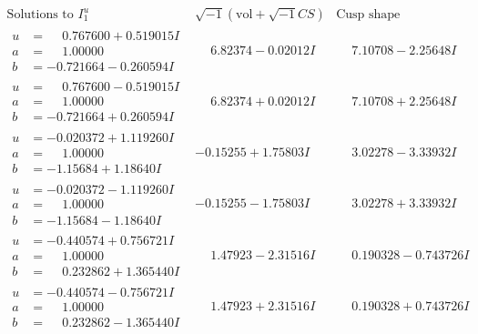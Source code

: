 \documentclass[1p]{elsarticle_modified}
\theoremstyle{definition}
\newcommand{\I}{\sqrt{-1}}
\begin{document}
$$\begin{array}{c|c|c}  
\text{Solutions to }I^u_{1}& \I (\text{vol} + \sqrt{-1}CS) & \text{Cusp shape}\\
 \hline 
\begin{aligned}
u &= \phantom{-}0.767600 + 0.519015 I \\
a &= \phantom{-}1.00000\phantom{ +0.000000I} \\
b &= -0.721664 - 0.260594 I\end{aligned}
 & \phantom{-}6.82374 - 0.02012 I & \phantom{-}7.10708 - 2.25648 I \\ \hline\begin{aligned}
u &= \phantom{-}0.767600 - 0.519015 I \\
a &= \phantom{-}1.00000\phantom{ +0.000000I} \\
b &= -0.721664 + 0.260594 I\end{aligned}
 & \phantom{-}6.82374 + 0.02012 I & \phantom{-}7.10708 + 2.25648 I \\ \hline\begin{aligned}
u &= -0.020372 + 1.119260 I \\
a &= \phantom{-}1.00000\phantom{ +0.000000I} \\
b &= -1.15684 + 1.18640 I\end{aligned}
 & -0.15255 + 1.75803 I & \phantom{-}3.02278 - 3.33932 I \\ \hline\begin{aligned}
u &= -0.020372 - 1.119260 I \\
a &= \phantom{-}1.00000\phantom{ +0.000000I} \\
b &= -1.15684 - 1.18640 I\end{aligned}
 & -0.15255 - 1.75803 I & \phantom{-}3.02278 + 3.33932 I \\ \hline\begin{aligned}
u &= -0.440574 + 0.756721 I \\
a &= \phantom{-}1.00000\phantom{ +0.000000I} \\
b &= \phantom{-}0.232862 + 1.365440 I\end{aligned}
 & \phantom{-}1.47923 - 2.31516 I & \phantom{-}0.190328 - 0.743726 I \\ \hline\begin{aligned}
u &= -0.440574 - 0.756721 I \\
a &= \phantom{-}1.00000\phantom{ +0.000000I} \\
b &= \phantom{-}0.232862 - 1.365440 I\end{aligned}
 & \phantom{-}1.47923 + 2.31516 I & \phantom{-}0.190328 + 0.743726 I \\ \hline\begin{aligned}

\end{aligned}
\end{array}$$
\end{document}
